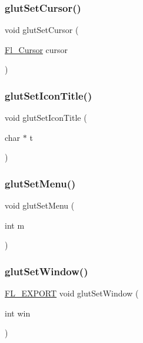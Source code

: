 \subsubsection{\texorpdfstring{glut\+Set\+Cursor()}{glutSetCursor()}}
{\footnotesize\ttfamily void glut\+Set\+Cursor (\begin{DoxyParamCaption}\item[{\hyperlink{_enumerations_8_h_a72bde974edc7926b1217dd51b8c7e8e0}{Fl\+\_\+\+Cursor}}]{cursor }\end{DoxyParamCaption})\hspace{0.3cm}{\ttfamily [inline]}}

\mbox{\label{glut_8_h_af65c6164f496ba7bc243bebf740c76ce}} 
\subsubsection{\texorpdfstring{glut\+Set\+Icon\+Title()}{glutSetIconTitle()}}
{\footnotesize\ttfamily void glut\+Set\+Icon\+Title (\begin{DoxyParamCaption}\item[{char $\ast$}]{t }\end{DoxyParamCaption})\hspace{0.3cm}{\ttfamily [inline]}}

\mbox{\label{glut_8_h_ae9305a85dfa56aaf98a70c005e4146be}} 
\subsubsection{\texorpdfstring{glut\+Set\+Menu()}{glutSetMenu()}}
{\footnotesize\ttfamily void glut\+Set\+Menu (\begin{DoxyParamCaption}\item[{int}]{m }\end{DoxyParamCaption})\hspace{0.3cm}{\ttfamily [inline]}}

\mbox{\label{glut_8_h_a2d831d984019fb16c84b10d167c3e5d6}} 
\subsubsection{\texorpdfstring{glut\+Set\+Window()}{glutSetWindow()}}
{\footnotesize\ttfamily \hyperlink{_fl___export_8_h_aa9ba29a18aee9d738370a06eeb4470fc}{F\+L\+\_\+\+E\+X\+P\+O\+RT} void glut\+Set\+Window (\begin{DoxyParamCaption}\item[{int}]{win }\end{DoxyParamCaption})}

